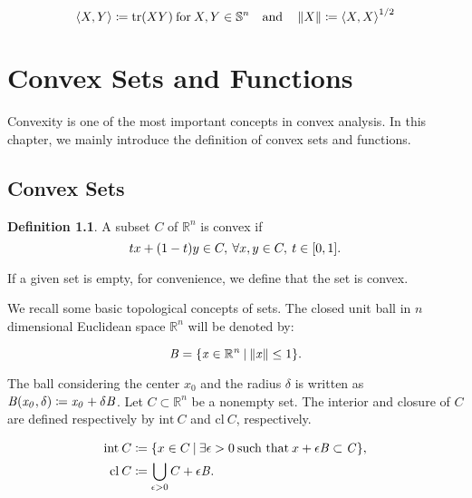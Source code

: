 \documentclass[a4paper,11pt, oneside]{book}
\theoremstyle{definition}
\newtheorem{dfn}{Definition}[section]
\newcommand{\NDemenstionalRealEuclideanSpace}{\mathbb{R}^n}
\newcommand{\NDemenstionalRealSymmetricMatrixSpace}{\mathbb{S}^n}
\newcommand{\Closure}[1]{\text{\rm cl\:${#1}$}} %
\newcommand{\Interior}[1]{\text{\rm int\:${#1}$}} %
\newcommand{\Trace}[1]{\text{\rm tr$({#1})$}} %
\newcommand{\InnerProduct}[2]{\left\langle {#1},{#2}\right\rangle} %
\newcommand{\SetForm}[2]{
  \{{#1}\:|\:{#2}\}
}
\begin{document}
  \begin{equation}
    \InnerProduct{X}{Y} \coloneqq \Trace{XY} \:\text{for}\: X,Y \in \NDemenstionalRealSymmetricMatrixSpace \quad \text{and} \quad \left\lVert X \right\rVert \coloneqq \InnerProduct{X}{X} ^{1/2} \notag
  \end{equation}

\chapter{Convex Sets and Functions}

Convexity is one of the most important concepts in convex analysis. In this chapter, we mainly introduce the definition of convex sets and functions.

\section{Convex Sets}

\begin{dfn}
  A subset $C$ of $\NDemenstionalRealEuclideanSpace$ is convex if
  \begin{equation}
    tx + (1-t)y \in C,\:\forall x,y \in C,\:t \in [0,1].\notag
  \end{equation}
\end{dfn}
If a given set is empty, for convenience, we define that the set is convex.

We recall some basic topological concepts of sets. The closed unit ball in $n$ dimensional Euclidean space $\NDemenstionalRealEuclideanSpace$ will be denoted by:

\begin{equation}
  \it{B} = \SetForm{x \in \NDemenstionalRealEuclideanSpace}{\left\lVert x \right\rVert \leq \text{1}}. \notag
\end{equation}

The ball considering the center $x_0$ and the radius $\delta$ is written as $\it{B}(x_0, \delta) \coloneqq x_0 + \delta \it{B}$. Let $C \subset \NDemenstionalRealEuclideanSpace$ be a nonempty set. The interior and closure of $C$ are defined respectively by $\text{int}\:C$ and $\text{cl}\:C$, respectively.

\begin{equation}
  \begin{split}
    \Interior{C} &\coloneqq \SetForm{x \in C}{\exists \epsilon > 0 \:\text{such that}\: x +\epsilon\it{B} \subset C}, \\
    \Closure{C} &\coloneqq \bigcup_{\epsilon > 0}{C + \epsilon\it{B}}. \notag \\
    \end{split}
\end{equation}
\end{document}
